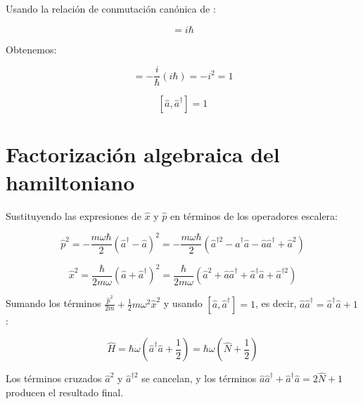 Usando la relación de conmutación canónica de \cite{born1925}:

\begin{equation}
	[\hat{x}, \hat{p}] = i\hbar
\end{equation}

Obtenemos:

\begin{equation}
	[\hat{a}, \hat{a}^\dagger] = -\frac{i}{\hbar}(i\hbar) = -i^2 = 1
\end{equation}

\begin{equation}
	\boxed{[\hat{a}, \hat{a}^\dagger] = 1}
\end{equation}	
	

 \section{Factorización algebraica del hamiltoniano}
 \label{sec:factorizacion}

 Sustituyendo las expresiones de $\hat{x}$ y $\hat{p}$ en términos de los
 operadores escalera:

\begin{equation}
 \hat{p}^2 = -\frac{m\omega\hbar}{2}(\hat{a}^\dagger - \hat{a})^2
           = -\frac{m\omega\hbar}{2}(\hat{a}^{\dagger 2} - \hat{a}^\dagger\hat{a}
             - \hat{a}\hat{a}^\dagger + \hat{a}^2)
\end{equation}

\begin{equation}
 \hat{x}^2 = \frac{\hbar}{2m\omega}(\hat{a} + \hat{a}^\dagger)^2
           = \frac{\hbar}{2m\omega}(\hat{a}^2 + \hat{a}\hat{a}^\dagger + \hat{a}^\dagger\hat{a} + \hat{a}^{\dagger 2})
\end{equation}

Sumando los términos $\frac{\hat{p}^2}{2m} + \frac{1}{2}m\omega^2\hat{x}^2$ y usando $[\hat{a},\hat{a}^\dagger]=1$, es decir,
$\hat{a}\hat{a}^\dagger = \hat{a}^\dagger\hat{a} + 1$:

\begin{equation}
\hat{H} = \hbar\omega\left(\hat{a}^\dagger\hat{a} + \frac{1}{2}\right)
         = \hbar\omega\left(\hat{N} + \frac{1}{2}\right)
\end{equation}

 Los términos cruzados $\hat{a}^2$ y $\hat{a}^{\dagger 2}$ se cancelan,
 y los términos $\hat{a}\hat{a}^\dagger + \hat{a}^\dagger\hat{a}
 = 2\hat{N} + 1$ producen el resultado final.


